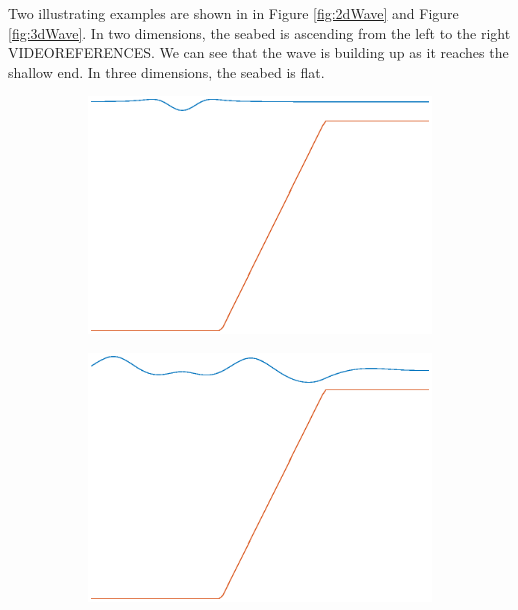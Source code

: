 \documentclass[12pt]{article}
\begin{document}
Two illustrating examples are shown in in Figure \ref{fig:2dWave} and Figure \ref{fig:3dWave}. In two dimensions, the seabed is ascending
from the left to the right VIDEOREFERENCES. We can see that the wave is building up as it reaches the shallow end. In three dimensions,
the seabed is flat.

\begin{figure}[!h]
\centering
\begin{subfigure}[b]{0.24\textwidth}
\includegraphics[width=\textwidth]{fig/2dLin1.eps}
\label{fig1}
\end{subfigure}
\begin{subfigure}[b]{0.24\textwidth}
\includegraphics[width=\textwidth]{fig/2dLin2.eps}
\label{fig1}
\end{subfigure}
\begin{subfigure}[b]{0.24\textwidth}

\end{subfigure}
\end{figure}
\end{document}
